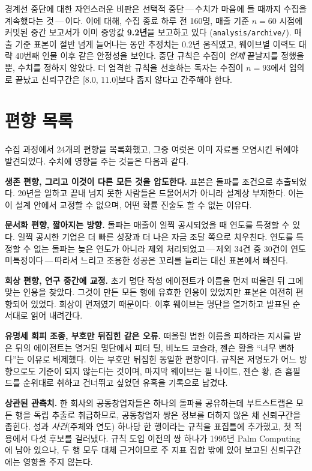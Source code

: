 \documentclass[11pt]{article}
\begin{document}
경계선 중단에 대한 자연스러운 비판은 선택적 중단\,---\,수치가 마음에 들 때까지
수집을 계속했다는 것\,---\,이다. 이에 대해, 수집 종료 하루 전 160명, 매출 기준
$n=60$ 시점에 커밋된 중간 보고서가 이미 중앙값 \textbf{9.2년}을 보고하고 있다
(\texttt{analysis/archive/}). 매출 기준 표본이 절반 넘게 늘어나는 동안 추정치는
0.2년 움직였고, 웨이브별 이력도 대략 40번째 인물 이후 같은 안정성을 보인다. 중단
규칙은 수집이 \emph{언제} 끝날지를 정했을 뿐, 수치를 정하지 않았다. 더 엄격한 규칙을
선호하는 독자는 수집이 $n=93$에서 임의로 끝났고 신뢰구간은 [8.0, 11.0]보다 좁지 않다고
간주해야 한다.

\section{편향 목록}

수집 과정에서 24개의 편향을 목록화했고, 그중 여럿은 이미 자료를 오염시킨 뒤에야
발견되었다. 수치에 영향을 주는 것들은 다음과 같다.

\textbf{생존 편향, 그리고 이것이 다른 모든 것을 압도한다.} 표본은 돌파를 조건으로
추출되었다. 20년을 일하고 끝내 넘지 못한 사람들은 드물어서가 아니라 설계상 부재한다.
이는 이 설계 안에서 교정할 수 없으며, 어떤 확률 진술도 할 수 없는 이유다.

\textbf{문서화 편향, 짧아지는 방향.} 돌파는 매출이 일찍 공시되었을 때 연도를 특정할 수
있다. 일찍 공시한 기업은 더 빠른 성장과 더 나은 자금 조달 쪽으로 치우친다. 연도를
특정할 수 없는 돌파는 늦은 연도가 아니라 제외 처리되었고\,---\,제외 34건 중 30건이
연도 미특정이다\,---\,따라서 느리고 조용한 성공은 꼬리를 늘리는 대신 표본에서 빠진다.

\textbf{회상 편향, 연구 중간에 교정.} 초기 명단 작성 에이전트가 이름을 먼저 떠올린 뒤
그에 맞는 인용을 찾았다. 그것이 만든 모든 행에 유효한 인용이 있었지만 표본은 여전히
편향되어 있었다. 회상이 먼저였기 때문이다. 이후 웨이브는 명단을 열거하고 발표된 순서대로
읽어 내려간다.

\textbf{유명세 회피 조종, 부호만 뒤집힌 같은 오류.} 떠올릴 법한 이름을 피하라는 지시를
받은 뒤의 에이전트는 열거된 명단에서 피터 틸, 비노드 코슬라, 젠슨 황을 ``너무 뻔하다''는
이유로 배제했다. 이는 부호만 뒤집힌 동일한 편향이다. 규칙은 저명도가 어느 방향으로도
기준이 되지 않는다는 것이며, 마지막 웨이브는 필 나이트, 젠슨 황, 존 홉필드를 순위대로
취하고 건너뛰고 싶었던 유혹을 기록으로 남겼다.

\textbf{상관된 관측치.} 한 회사의 공동창업자들은 하나의 돌파를 공유하는데 부트스트랩은
모든 행을 독립 추출로 취급하므로, 공동창업자 쌍은 정보를 더하지 않은 채 신뢰구간을
좁힌다. 성과 \emph{사건}(주체와 연도) 하나당 한 행이라는 규칙을 표집틀에 추가했고, 첫
적용에서 다섯 후보를 걸러냈다. 규칙 도입 이전의 쌍 하나가 1995년 Palm Computing에
남아 있으나, 두 행 모두 대체 근거이므로 주 지표 집합 밖에 있어 보고된 신뢰구간에는
영향을 주지 않는다.
\end{document}
